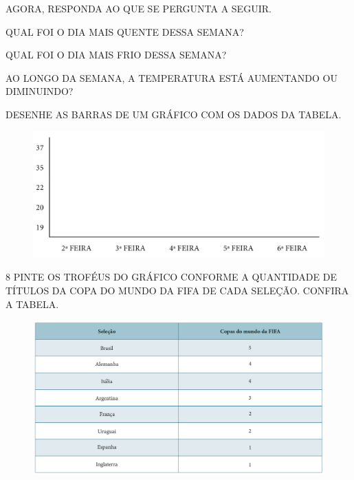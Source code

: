 AGORA, RESPONDA AO QUE SE PERGUNTA A SEGUIR.

\begin{escolha}
\item QUAL FOI O DIA MAIS QUENTE DESSA SEMANA?


\item QUAL FOI O DIA MAIS FRIO DESSA SEMANA?


\item AO LONGO DA SEMANA, A TEMPERATURA ESTÁ AUMENTANDO OU DIMINUINDO?


\item DESENHE AS BARRAS DE UM GRÁFICO COM OS DADOS DA TABELA.

\begin{figure}[htpb!]
\centering
\includegraphics[width=\textwidth]{../ilustracoes/MAT1/SAEB_1ANO_MAT_FIGURA106.png}
\end{figure}

\end{escolha}


\num{8} PINTE OS TROFÉUS DO GRÁFICO CONFORME A QUANTIDADE DE TÍTULOS DA COPA DO
MUNDO DA FIFA DE CADA SELEÇÃO. CONFIRA A TABELA.

\begin{figure}[htpb!]
\centering
\includegraphics[width=\textwidth]{../ilustracoes/MAT1/SAEB_1ANO_MAT_FIGURA107.png}
\end{figure}

